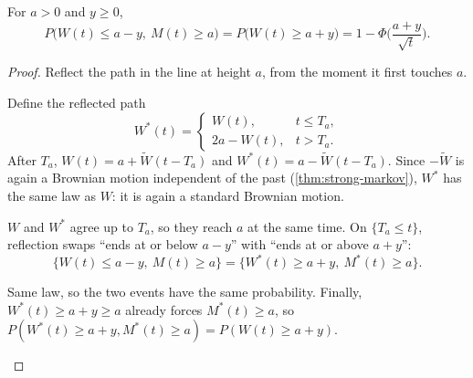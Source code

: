 \begin{theorem}
\label{thm:reflection}
For $a>0$ and $y\ge0$,
\[
  P\big(W(t)\le a-y,\ M(t)\ge a\big)=P\big(W(t)\ge a+y\big)=1-\Phi\Big(\frac{a+y}{\sqrt t}\Big).
\]
\end{theorem}
\begin{proof}
Reflect the path in the line at height $a$, from the moment it first touches $a$.
\begin{steps}
  \item Define the reflected path
  \[
    W^*(t)=\begin{cases}W(t),&t\le T_a,\\ 2a-W(t),&t>T_a.\end{cases}
  \]
  After $T_a$, $W(t)=a+\tilde W(t-T_a)$ and $W^*(t)=a-\tilde W(t-T_a)$. Since $-\tilde W$ is again a Brownian motion independent of the past (\cref{thm:strong-markov}), $W^*$ has the same law as $W$: it is again a standard Brownian motion.
  \item $W$ and $W^*$ agree up to $T_a$, so they reach $a$ at the same time. On $\{T_a\le t\}$, reflection swaps ``ends at or below $a-y$'' with ``ends at or above $a+y$'':
  \[
    \{W(t)\le a-y,\ M(t)\ge a\}=\{W^*(t)\ge a+y,\ M^*(t)\ge a\}.
  \]
  \item Same law, so the two events have the same probability. Finally, $W^*(t)\ge a+y\ge a$ already forces $M^*(t)\ge a$, so $P(W^*(t)\ge a+y,M^*(t)\ge a)=P(W(t)\ge a+y)$. \qedhere
\end{steps}
\end{proof}

\begin{pic}
\end{pic}

